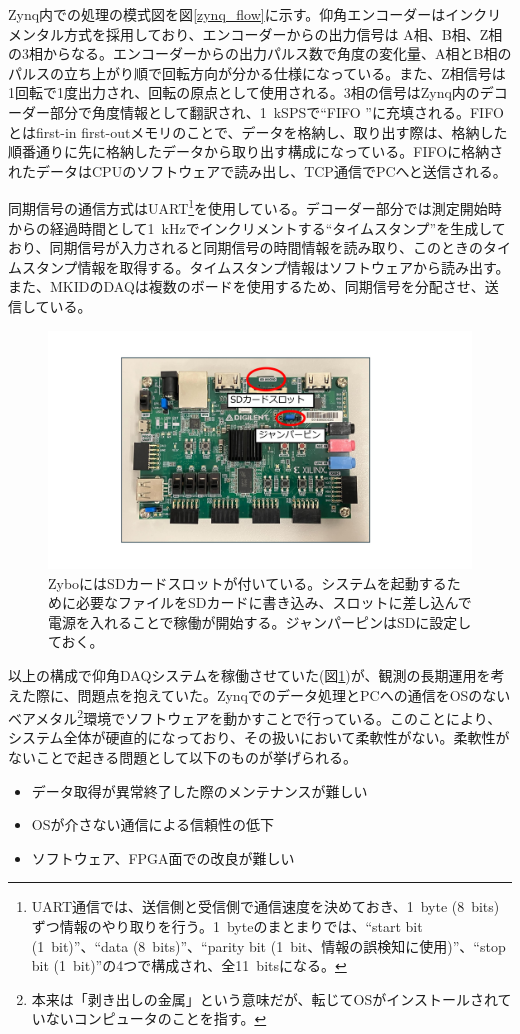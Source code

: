Zynq内での処理の模式図を図\ref{zynq_flow}に示す。仰角エンコーダーはインクリメンタル方式を採用しており、エンコーダーからの出力信号は A相、B相、Z相の3相からなる。エンコーダーからの出力パルス数で角度の変化量、A相とB相のパルスの立ち上がり順で回転方向が分かる仕様になっている。また、Z相信号は1回転で1度出力され、回転の原点として使用される。3相の信号はZynq内のデコーダー部分で角度情報として翻訳され、\SI{1}{kSPS}で``FIFO \cite{FIFO}''に充填される。FIFOとはfirst-in first-outメモリのことで、データを格納し、取り出す際は、格納した順番通りに先に格納したデータから取り出す構成になっている。FIFOに格納されたデータはCPUのソフトウェアで読み出し、TCP通信でPCへと送信される。

同期信号の通信方式はUART\footnote{UART通信では、送信側と受信側で通信速度を決めておき、\SI{1}{byte} (\SI{8}{bits})ずつ情報のやり取りを行う。\SI{1}{byte}のまとまりでは、``start bit (\SI{1}{bit})''、``data (\SI{8}{bits})''、``parity bit (\SI{1}{bit}、情報の誤検知に使用)''、``stop bit (\SI{1}{bit})''の4つで構成され、全\SI{11}{bits}になる。}を使用している。デコーダー部分では測定開始時からの経過時間として\SI{1}{kHz}でインクリメントする``タイムスタンプ''を生成しており、同期信号が入力されると同期信号の時間情報を読み取り、このときのタイムスタンプ情報を取得する。タイムスタンプ情報はソフトウェアから読み出す。また、MKIDのDAQは複数のボードを使用するため、同期信号を分配させ、送信している。

\begin{figure}[htbp]
  \centering
  \includegraphics[width=0.6\columnwidth]{4_elDAQ/figs/sd_zybo2.pdf}
  \caption{ZyboにはSDカードスロットが付いている。システムを起動するために必要なファイルをSDカードに書き込み、スロットに差し込んで電源を入れることで稼働が開始する。ジャンパーピンはSDに設定しておく。}
  \label{sd_zybo}
\end{figure}

以上の構成で仰角DAQシステムを稼働させていた(図\ref{sd_zybo})が、観測の長期運用を考えた際に、問題点を抱えていた。Zynqでのデータ処理とPCへの通信をOSのないベアメタル\footnote{本来は「剥き出しの金属」という意味だが、転じてOSがインストールされていないコンピュータのことを指す。}環境でソフトウェアを動かすことで行っている。このことにより、システム全体が硬直的になっており、その扱いにおいて柔軟性がない。柔軟性がないことで起きる問題として以下のものが挙げられる。
\begin{itemize}
  \item データ取得が異常終了した際のメンテナンスが難しい
  \item OSが介さない通信による信頼性の低下
  \item ソフトウェア、FPGA面での改良が難しい
\end{itemize}

